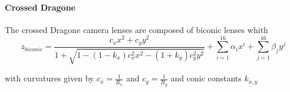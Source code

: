 \documentclass{article}
\begin{document}
\paragraph{Crossed Dragone} The crossed Dragone camera lenses are composed of biconic lenses whith \begin{equation}
	z_{biconic} = \frac{c_x x^2 + c_y y^2}{1+ \sqrt{1-(1-k_x)c_x^2 x^2-(1+k_y)c_y^2y^2}} + \sum_{i=1}^{16} \alpha_i x^i + \sum_{j=1}^{16} \beta_j y^j 
\end{equation}

with curvatures given by  $c_x=\frac{1}{R_x}$ and $c_y=\frac{1}{R_y}$ and conic constants $k_{x,y}$
\end{document}
